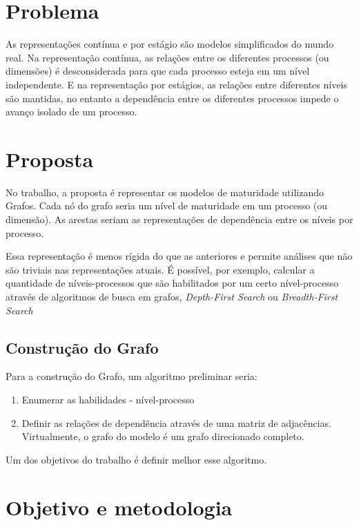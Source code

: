 \documentclass[10pt,a4paper]{article}
\begin{document}
	\section{Problema}
	
	As representações contínua e por estágio são modelos simplificados do mundo real. 
	Na representação contínua, as relações entre os diferentes processos (ou dimensões) é desconsiderada para que cada processo esteja em um nível independente. E na representação por estágios, as relações entre diferentes níveis são mantidas, no entanto a dependência entre os diferentes processos impede o avanço isolado de um processo.
	
	\section{Proposta}
	
	No trabalho, a proposta é representar os modelos de maturidade utilizando Grafos. Cada nó do grafo seria um nível de maturidade em um processo (ou dimensão). As arestas seriam as representações de dependência entre os níveis por processo.
	
	Essa representação é menos rígida do que as anteriores e permite análises que não são triviais nas representações atuais. É possível, por exemplo, calcular a quantidade de níveis-processos que são habilitados por um certo nível-processo através de algoritmos de busca em grafos, \emph{Depth-First Search} ou \emph{Breadth-First Search}
	
	\subsection{Construção do Grafo}
	
	Para a construção do Grafo, um algoritmo preliminar seria:
	
	\begin{enumerate}
	    \item Enumerar as habilidades - nível-processo
	    \item Definir as relações de dependência através de uma matriz de adjacências. Virtualmente, o grafo do modelo é um grafo direcionado completo.
	\end{enumerate}
	
	Um dos objetivos do trabalho é definir melhor esse algoritmo.
	
	\section{Objetivo e metodologia}
	
\end{document}
